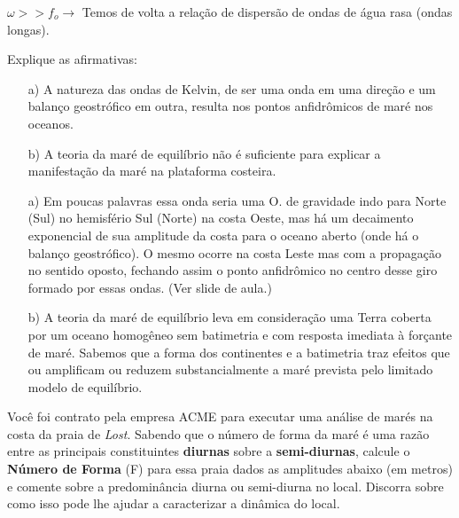 \documentclass[letterpaper,portuguese,12pt,pdftex]{exam}
\begin{document}
\begin{questions}
\begin{parts}
\begin{solution}
\raggedright
  $\omega >> f_o \rightarrow$ Temos de volta a relação de dispersão de ondas de
  água rasa (ondas longas).\\
\end{solution}
\end{parts}

\question[2]
Explique as afirmativas:
\begin{itemize}
  \item[a)] A natureza das ondas de Kelvin, de ser uma onda em uma direção e um
        balanço geostrófico em outra, resulta nos pontos anfidrômicos de maré
        nos oceanos.
  \item[b)] A teoria da maré de equilíbrio não é suficiente para explicar a
            manifestação da maré na plataforma costeira.
\end{itemize}

\begin{solution}
  \begin{itemize}
    \item[a)] Em poucas palavras essa onda seria uma O. de gravidade indo para
    Norte (Sul) no hemisfério Sul (Norte) na costa Oeste, mas há um decaimento
    exponencial de sua amplitude da costa para o oceano aberto (onde há o
    balanço geostrófico).  O mesmo ocorre na costa Leste mas com a propagação no
    sentido oposto, fechando assim o ponto anfidrômico no centro desse giro
    formado por essas ondas. (Ver slide de aula.)
    \item[b)] A teoria da maré de equilíbrio leva em consideração uma Terra
    coberta por um oceano homogêneo sem batimetria e com resposta imediata à
    forçante de maré.  Sabemos que a forma dos continentes e a batimetria traz
    efeitos que ou amplificam ou reduzem substancialmente a maré prevista pelo
    limitado modelo de equilíbrio.
  \end{itemize}
\end{solution}

\question[3]
Você foi contrato pela empresa ACME\circledR{} para executar uma análise de
marés na costa da praia de {\it Lost}.  Sabendo que o número de forma da maré é uma
razão entre as principais constituintes {\bf diurnas} sobre a
{\bf semi-diurnas}, calcule o {\bf Número de Forma} (F) para essa praia dados as
amplitudes abaixo (em metros) e comente sobre a predominância diurna ou
semi-diurna no local.  Discorra sobre como isso pode lhe ajudar a caracterizar
a dinâmica do local.


\end{questions}
\end{document}
